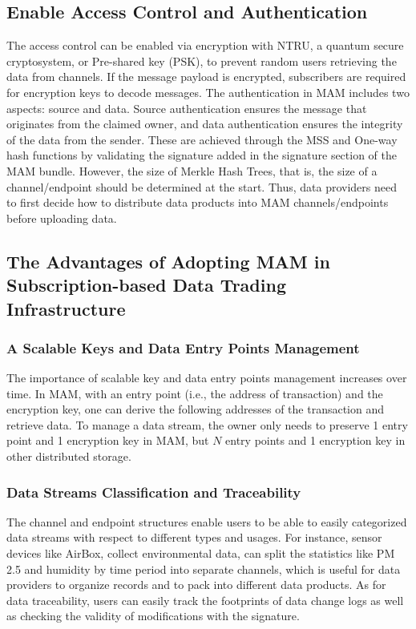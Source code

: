 \documentclass[conference]{IEEEtran}
\begin{document}
\subsection{Enable Access Control and Authentication}
\label{section:mam_functions}
The access control can be enabled via encryption with NTRU\cite{NTRU}, a quantum secure cryptosystem, or Pre-shared key (PSK), to prevent random users retrieving the data from channels. If the message payload is encrypted, subscribers are required for encryption keys to decode messages. The authentication in MAM includes two aspects: source and data. Source authentication ensures the message that originates from the claimed owner, and data authentication ensures the integrity of the data from the sender. These are achieved through the MSS and One-way hash functions by validating the signature added in the signature section of the MAM bundle. However, the size of Merkle Hash Trees, that is, the size of a channel/endpoint should be determined at the start. Thus, data providers need to first decide how to distribute data products into MAM channels/endpoints before uploading data.

\subsection{The Advantages of Adopting MAM in Subscription-based Data Trading Infrastructure}
\label{section:mam_features}
\subsubsection{A Scalable Keys and Data Entry Points Management}
The importance of scalable key and data entry points management increases over time. In MAM, with an entry point (i.e., the address of transaction) and the encryption key, one can derive the following addresses of the transaction and retrieve data. To manage a data stream, the owner only needs to preserve 1 entry point and 1 encryption key in MAM, but $N$ entry points and 1 encryption key in other distributed storage.

\subsubsection{Data Streams Classification and Traceability}
The channel and endpoint structures enable users to be able to easily categorized data streams with respect to different types and usages. For instance, sensor devices like AirBox\cite{LASS}, collect environmental data, can split the statistics like PM 2.5 and humidity by time period into separate channels, which is useful for data providers to organize records and to pack into different data products. As for data traceability, users can easily track the footprints of data change logs as well as checking the validity of modifications with the signature.
\end{document}
